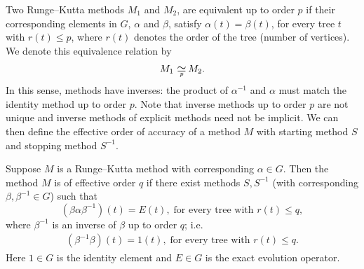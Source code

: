 \documentclass{siamltex}  %
\begin{document}
Two Runge--Kutta methods $M_1$ and $M_2$, are equivalent up to order
$p$ if their corresponding elements in $G$, $\alpha$ and $\beta$, satisfy
$\alpha(t) = \beta(t)$, for every tree $t$ with $r(t) \leq p$,
where $r(t)$ denotes the order of the tree (number of vertices).
We denote this equivalence relation by
$$M_1 \equival{p} M_2.$$
In this sense, methods have inverses: the product of $\alpha^{-1}$ and
$\alpha$ must match the identity method up to order $p$.
Note that inverse methods up to order $p$ are not unique and inverse 
methods of explicit methods need not be implicit.
We can then define the effective order of accuracy of a method $M$
with starting method $S$ and stopping method $S^{-1}$.
\begin{definition}\cite[\S~389]{Butcher2008_book}\label{def:Effective_order}
  Suppose $M$ is a Runge--Kutta method with corresponding $\alpha \in G$.
  Then the method $M$ is of effective order $q$ if there exist methods
  $S,S^{-1}$ (with corresponding $\beta, \beta^{-1} \in G$) such that
	\begin{equation}\label{eq:Effective_order_1}
		(\beta\alpha\beta^{-1})(t) = E(t), \; \text{for every tree with } r(t) \leq q,
	\end{equation}
        where $\beta^{-1}$ is an inverse of $\beta$ up to order $q$; i.e.
        \begin{align*}
        		(\beta^{-1}\beta)(t) = 1(t), \; \text{for every tree with } r(t) \leq q.
		\end{align*}	        
        Here $1\in G$ is the identity element
        and $E\in G$ is the exact evolution operator.
\end{definition}
\end{document}
